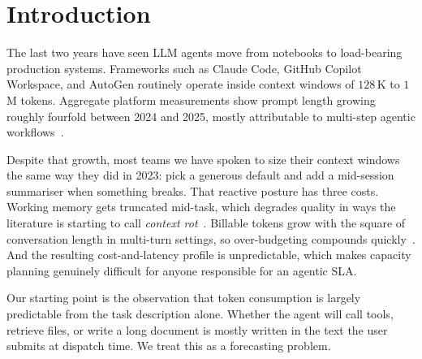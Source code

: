 \documentclass{article}
\newcommand{\code}[1]{\texttt{\small #1}}
\begin{document}
\begin{abstract}
input-token consumption by 72.0\% across 14 directly-observed LLM
calls (215{,}438 to 60{,}250 tokens),
with single-call compression ratios as tight as 0.12, against
a wider 83-turn population whose mean input is 27{,}757 tokens
per turn (median 22{,}382). The product of that 72\% reduction
and the measured per-turn input is roughly 19{,}985 saved input
tokens per turn; projected at 1{,}000 turns per day this is
\$1{,}094, \$18{,}236, and \$21{,}883 per year on
\code{gpt-4o-mini}, \code{gpt-4o}, and \code{claude-sonnet-4.5}
respectively, with no LLM call inside the optimiser. On 83 production turns, training on local traffic reaches 25\% within-20\%
(vs.\ 6\% for synthetic-only transfer); per-stage GBT regressors raise mean
stagewise accuracy by 9.3~pp. ContextOptimizer is live but not yet wired to
TABF; we report 77\% task-complete status observationaly and compare against a
training-free truncation baseline on four agent personas. All code, CSVs, and
seeds are released.
\end{abstract}

\section{Introduction}
\label{sec:intro}

The last two years have seen LLM agents move from notebooks to load-bearing
production systems. Frameworks such as Claude Code, GitHub Copilot
Workspace, and AutoGen routinely operate inside context windows of
$128\,$K to $1\,$M tokens. Aggregate platform measurements show prompt
length growing roughly fourfold between 2024 and 2025, mostly attributable
to multi-step agentic workflows~\citep{aubakirova2025}.

Despite that growth, most teams we have spoken to size their context
windows the same way they did in 2023: pick a generous default and add a
mid-session summariser when something breaks. That reactive posture has
three costs. Working memory gets truncated mid-task, which degrades quality
in ways the literature is starting to call \emph{context
rot}~\citep{hong2025}. Billable tokens grow with the square of conversation
length in multi-turn settings, so over-budgeting compounds
quickly~\citep{tokalator2026}. And the resulting cost-and-latency profile is
unpredictable, which makes capacity planning genuinely difficult for
anyone responsible for an agentic SLA.

Our starting point is the observation that token consumption is largely
predictable from the task description alone. Whether the agent will call
tools, retrieve files, or write a long document is mostly written in the
text the user submits at dispatch time. We treat this as a forecasting
problem.
\end{document}
